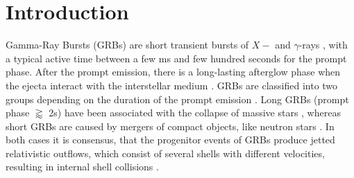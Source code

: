 \documentclass[twocolumn,traditabstract]{aa}
\begin{document}


\maketitle

\section{Introduction}

Gamma-Ray Bursts (GRBs) are short transient bursts of $X-$ and $\gamma$-rays \citep{Klebesadel+1973}, with a typical active time between a few ms and few hundred seconds for the prompt phase.
After the prompt emission, there is a long-lasting afterglow phase when the ejecta interact with the interstellar medium \citep{MeszarosRees1997, afterglow}. GRBs are classified into two groups depending on the duration of the prompt emission \citep{shortlong}. Long GRBs (prompt phase $\gtrapprox$ 2s) have been associated with the collapse of massive stars \citep{SN1, Hjorth+2003, SN2}, whereas short GRBs are  caused by mergers of compact objects, like neutron stars \citep{Eichler+1989, gw}. In both cases it is consensus, that the progenitor events of GRBs produce jetted relativistic outflows, which consist of several shells with different velocities, resulting in internal shell collisions \citep{ReesMeszaros1994, Mochkovitch+1995}.
\end{document}
